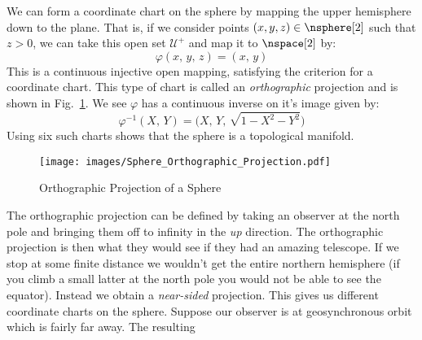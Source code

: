 \documentclass{book}                                                            %
\begin{document}
                \begin{example}
                    We can form a coordinate chart on the sphere by mapping the
                    upper hemisphere down to the plane. That is, if we consider
                    points $(x,y,z)\in\nsphere[2]$ such that $z>0$, we can take
                    this open set $\mathcal{U}^{+}$ and map it to $\nspace[2]$
                    by:
                    \begin{equation}
                        \varphi(x,\,y,\,z)=(x,\,y)
                    \end{equation}
                    This is a continuous injective open mapping, satisfying the
                    criterion for a coordinate chart. This type of chart is
                    called an \textit{orthographic} projection and is shown in
                    Fig.~\ref{fig:Sphere_Orthographic_Projection}. We see
                    $\varphi$ has a continuous inverse on it's image given by:
                    \begin{equation}
                        \varphi^{\minus{1}}(X,\,Y)=
                            \big(X,\,Y,\,\sqrt{1-X^{2}-Y^{2}}\big)
                    \end{equation}
                    Using six such charts shows that the sphere is a topological
                    manifold.
                \end{example}
                \begin{figure}[H]
                    \centering
                    \captionsetup{type=figure}
                    \texttt{[image: images/Sphere\_Orthographic\_Projection.pdf]}
                    \caption{Orthographic Projection of a Sphere}
                    \label{fig:Sphere_Orthographic_Projection}
                \end{figure}
                The orthographic projection can be defined by taking an observer
                at the north pole and bringing them off to infinity in the
                \textit{up} direction. The orthographic projection is then what
                they would see if they had an amazing telescope. If we stop at
                some finite distance we wouldn't get the entire northern
                hemisphere (if you climb a small latter at the north pole you
                would not be able to see the equator). Instead we obtain a
                \textit{near-sided} projection. This gives us different
                coordinate charts on the sphere. Suppose our observer is at
                geosynchronous orbit which is fairly far away. The resulting
\end{document}
